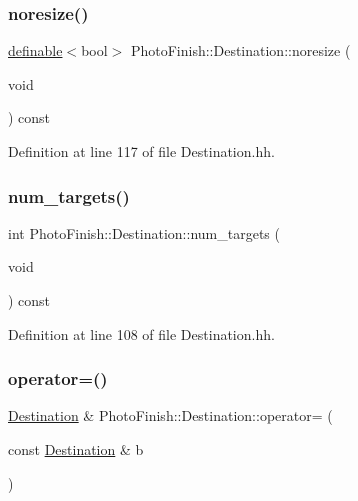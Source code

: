 \subsubsection{\texorpdfstring{noresize()}{noresize()}}
{\footnotesize\ttfamily \hyperlink{class_photo_finish_1_1definable}{definable}$<$bool$>$ Photo\+Finish\+::\+Destination\+::noresize (\begin{DoxyParamCaption}\item[{void}]{ }\end{DoxyParamCaption}) const\hspace{0.3cm}{\ttfamily [inline]}}



Definition at line 117 of file Destination.\+hh.

\mbox{\label{class_photo_finish_1_1_destination_a9b605477d0d0479c1dd8f897004e600b}} 
\subsubsection{\texorpdfstring{num\+\_\+targets()}{num\_targets()}}
{\footnotesize\ttfamily int Photo\+Finish\+::\+Destination\+::num\+\_\+targets (\begin{DoxyParamCaption}\item[{void}]{ }\end{DoxyParamCaption}) const\hspace{0.3cm}{\ttfamily [inline]}}



Definition at line 108 of file Destination.\+hh.

\mbox{\label{class_photo_finish_1_1_destination_a55a37b1751bb96051e81b7940aa9efb0}} 
\subsubsection{\texorpdfstring{operator=()}{operator=()}}
{\footnotesize\ttfamily \hyperlink{class_photo_finish_1_1_destination}{Destination} \& Photo\+Finish\+::\+Destination\+::operator= (\begin{DoxyParamCaption}\item[{const \hyperlink{class_photo_finish_1_1_destination}{Destination} \&}]{b }\end{DoxyParamCaption})}



